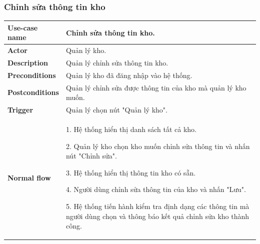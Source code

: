         \subsubsection{Chỉnh sửa thông tin kho}
        {
\setlength\extrarowheight{6pt}
            \begin{longtable}{| p{} | p{} |} 
                \hline
                 \textbf{Use-case name} 
                & 
                Chỉnh sửa thông tin kho.
                \\
                \hline
                \textbf{Actor} 
                & 
                Quản lý kho.
                \\
                \hline
                \textbf{Description} 
                & 
                Quản lý chỉnh sửa thông tin kho.
                \\
                \hline
                 \textbf{Preconditions} 
                &
                Quản lý kho đã đăng nhập vào hệ thống.
                \\
                \hline
                \textbf{Postconditions} 
                & 
                Quản lý chỉnh sửa được thông tin của kho mà quản lý kho muốn.
                \\
                \hline
                \textbf{Trigger} 
                & 
                Quản lý chọn nút "Quản lý kho".
                \\
                \hline
                \begin{flushleft}
                 \textbf{Normal flow}
                \end{flushleft}
                & 
                1. Hệ thống hiển thị danh sách tất cả kho.
                    
                    2. Quản lý kho chọn kho muốn chỉnh sửa thông tin và nhấn nút "Chỉnh sửa".
                    
                    3. Hệ thống hiển thị thông tin kho có sẵn.
                    
                    4. Người dùng chỉnh sửa thông tin của kho và nhấn "Lưu".
                    
                    5. Hệ thống tiến hành kiểm tra định dạng các thông tin mà người dùng chọn và thông báo kết quả chỉnh sửa kho thành công.
                    

\end{longtable}}
